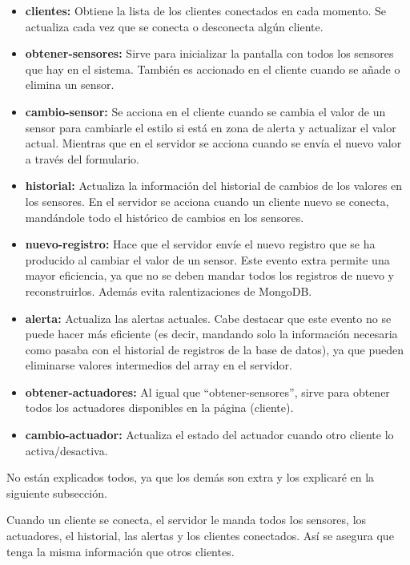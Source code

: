 \documentclass{article}
\begin{document}
\begin{itemize}
    \item \textbf{clientes: }Obtiene la lista de los clientes conectados en cada momento. Se actualiza cada vez que se conecta o desconecta algún cliente.
    \item \textbf{obtener-sensores: }Sirve para inicializar la pantalla con todos los sensores que hay en el sistema. También es accionado en el cliente cuando se añade o elimina un sensor.
    \item \textbf{cambio-sensor: }Se acciona en el cliente cuando se cambia el valor de un sensor para cambiarle el estilo si está en zona de alerta y actualizar el valor actual. Mientras que en el servidor se acciona cuando se envía el nuevo valor a través del formulario.
    \item \textbf{historial: }Actualiza la información del historial de cambios de los valores en los sensores. En el servidor se acciona cuando un cliente nuevo se conecta, mandándole todo el histórico de cambios en los sensores.
    \item \textbf{nuevo-registro: }Hace que el servidor envíe el nuevo registro que se ha producido al cambiar el valor de un sensor. Este evento extra permite una mayor eficiencia, ya que no se deben mandar todos los registros de nuevo y reconstruirlos. Además evita ralentizaciones de MongoDB.
    \item \textbf{alerta: }Actualiza las alertas actuales. Cabe destacar que este evento no se puede hacer más eficiente (es decir, mandando solo la información necesaria como pasaba con el historial de registros de la base de datos), ya que pueden eliminarse valores intermedios del array en el servidor.
    \item \textbf{obtener-actuadores: }Al igual que ``obtener-sensores'', sirve para obtener todos los actuadores disponibles en la página (cliente).
    \item \textbf{cambio-actuador: }Actualiza el estado del actuador cuando otro cliente lo activa/desactiva.
\end{itemize}

No están explicados todos, ya que los demás son extra y los explicaré en la siguiente subsección.

\bigskip

Cuando un cliente se conecta, el servidor le manda todos los sensores, los actuadores, el historial, las alertas y los clientes conectados. Así se asegura que tenga la misma información que otros clientes.
\end{document}

